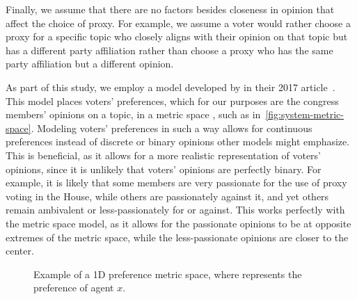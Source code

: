 Finally, we assume that there are no factors besides closeness in opinion that affect
the choice of proxy.
For example, we assume a voter would rather choose a proxy for a specific topic who
closely aligns with their opinion on that topic but has a different party affiliation
rather than choose a proxy who has the same party affiliation but a different opinion.

As part of this study, we employ a model developed by  in
their 2017 article~\cite{Cohensius2017}.
This model places voters' preferences, which for our purposes are the congress
members' opinions on a topic, in a metric space \systemspace, such as
in~\autoref{fig:system-metric-space}.
Modeling voters' preferences in such a way allows for continuous preferences instead of
discrete or binary opinions other models might emphasize.
This is beneficial, as it allows for a more realistic representation of voters'
opinions, since it is unlikely that voters' opinions are perfectly binary.
For example, it is likely that some members are very passionate for the
use of proxy voting in the House, while others are passionately against it, and yet
others remain ambivalent or less-passionately for or against.
This works perfectly with the metric space model, as it allows for the passionate
opinions to be at opposite extremes of the metric space, while the less-passionate
opinions are closer to the center.

\begin{figure}[htbp]
    \centering

    \caption{Example of a 1D preference metric space, where  represents the
    preference of agent $x$.}
    \label{fig:system-metric-space}
\end{figure}

